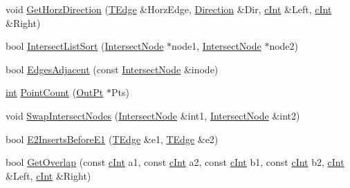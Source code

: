 \begin{DoxyCompactItemize}
\item 
void \mbox{\hyperlink{namespace_clipper_lib_a3a6a98076d47afe4c2e033833ae89bf5}{Get\+Horz\+Direction}} (\mbox{\hyperlink{struct_clipper_lib_1_1_t_edge}{T\+Edge}} \&Horz\+Edge, \mbox{\hyperlink{namespace_clipper_lib_a50027cc5a43f727ff89bcadf7e4524a7}{Direction}} \&Dir, \mbox{\hyperlink{namespace_clipper_lib_a7156730a24951629192d4831334bafaa}{c\+Int}} \&Left, \mbox{\hyperlink{namespace_clipper_lib_a7156730a24951629192d4831334bafaa}{c\+Int}} \&Right)
\item 
bool \mbox{\hyperlink{namespace_clipper_lib_aeb44a42315262aee3bfbecbc6a1eac77}{Intersect\+List\+Sort}} (\mbox{\hyperlink{struct_clipper_lib_1_1_intersect_node}{Intersect\+Node}} $\ast$node1, \mbox{\hyperlink{struct_clipper_lib_1_1_intersect_node}{Intersect\+Node}} $\ast$node2)
\item 
bool \mbox{\hyperlink{namespace_clipper_lib_a178785f2e51a19d1e6bdb8848d14b924}{Edges\+Adjacent}} (const \mbox{\hyperlink{struct_clipper_lib_1_1_intersect_node}{Intersect\+Node}} \&inode)
\item 
\mbox{\hyperlink{draw_8hh_aa620a13339ac3a1177c86edc549fda9b}{int}} \mbox{\hyperlink{namespace_clipper_lib_a116d97a3199f4a29f2327b498af00469}{Point\+Count}} (\mbox{\hyperlink{struct_clipper_lib_1_1_out_pt}{Out\+Pt}} $\ast$Pts)
\item 
void \mbox{\hyperlink{namespace_clipper_lib_ac299ceb4a2a28061aa452bd069e2c4a3}{Swap\+Intersect\+Nodes}} (\mbox{\hyperlink{struct_clipper_lib_1_1_intersect_node}{Intersect\+Node}} \&int1, \mbox{\hyperlink{struct_clipper_lib_1_1_intersect_node}{Intersect\+Node}} \&int2)
\item 
bool \mbox{\hyperlink{namespace_clipper_lib_ae002e65db41b2e12c6a29b6c53d95e3d}{E2\+Inserts\+Before\+E1}} (\mbox{\hyperlink{struct_clipper_lib_1_1_t_edge}{T\+Edge}} \&e1, \mbox{\hyperlink{struct_clipper_lib_1_1_t_edge}{T\+Edge}} \&e2)
\item 
bool \mbox{\hyperlink{namespace_clipper_lib_a489c460712308f4a5026b8618b6b319b}{Get\+Overlap}} (const \mbox{\hyperlink{namespace_clipper_lib_a7156730a24951629192d4831334bafaa}{c\+Int}} a1, const \mbox{\hyperlink{namespace_clipper_lib_a7156730a24951629192d4831334bafaa}{c\+Int}} a2, const \mbox{\hyperlink{namespace_clipper_lib_a7156730a24951629192d4831334bafaa}{c\+Int}} b1, const \mbox{\hyperlink{namespace_clipper_lib_a7156730a24951629192d4831334bafaa}{c\+Int}} b2, \mbox{\hyperlink{namespace_clipper_lib_a7156730a24951629192d4831334bafaa}{c\+Int}} \&Left, \mbox{\hyperlink{namespace_clipper_lib_a7156730a24951629192d4831334bafaa}{c\+Int}} \&Right)

\end{DoxyCompactItemize}

